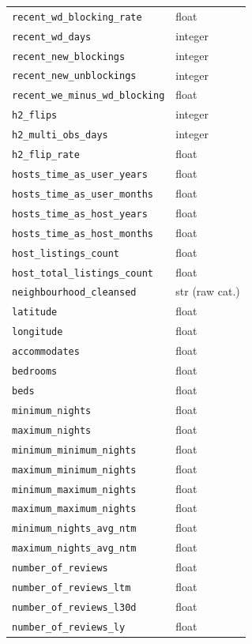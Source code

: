 \documentclass[journal]{IEEEtran}
\begin{document}
\begin{longtable}{p{2.2in}p{0.8in}}
\texttt{recent\_wd\_blocking\_rate} & float \\
\texttt{recent\_wd\_days} & integer \\
\texttt{recent\_new\_blockings} & integer \\
\texttt{recent\_new\_unblockings} & integer \\
\texttt{recent\_we\_minus\_wd\_blocking} & float \\
\texttt{h2\_flips} & integer \\
\texttt{h2\_multi\_obs\_days} & integer \\
\texttt{h2\_flip\_rate} & float \\
\texttt{hosts\_time\_as\_user\_years} & float \\
\texttt{hosts\_time\_as\_user\_months} & float \\
\texttt{hosts\_time\_as\_host\_years} & float \\
\texttt{hosts\_time\_as\_host\_months} & float \\
\texttt{host\_listings\_count} & float \\
\texttt{host\_total\_listings\_count} & float \\
\texttt{neighbourhood\_cleansed} & str (raw cat.) \\
\texttt{latitude} & float \\
\texttt{longitude} & float \\
\texttt{accommodates} & float \\
\texttt{bedrooms} & float \\
\texttt{beds} & float \\
\texttt{minimum\_nights} & float \\
\texttt{maximum\_nights} & float \\
\texttt{minimum\_minimum\_nights} & float \\
\texttt{maximum\_minimum\_nights} & float \\
\texttt{minimum\_maximum\_nights} & float \\
\texttt{maximum\_maximum\_nights} & float \\
\texttt{minimum\_nights\_avg\_ntm} & float \\
\texttt{maximum\_nights\_avg\_ntm} & float \\
\texttt{number\_of\_reviews} & float \\
\texttt{number\_of\_reviews\_ltm} & float \\
\texttt{number\_of\_reviews\_l30d} & float \\
\texttt{number\_of\_reviews\_ly} & float \\

\end{longtable}
\end{document}
